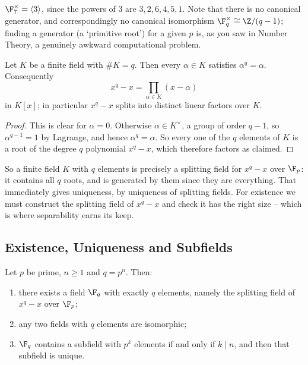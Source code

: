 \begin{example}
	$\F_7^\times = \langle 3 \rangle$, since the powers of $3$ are $3, 2, 6, 4, 5, 1$. Note that there is no canonical generator, and correspondingly no canonical isomorphism $\F_q^\times \cong \Z/(q-1)$; finding a generator (a `primitive root') for a given $p$ is, as you saw in Number Theory, a genuinely awkward computational problem.
\end{example}

\begin{lemma}\label{lem:fermat}
	Let $K$ be a finite field with $\#K = q$. Then every $\alpha \in K$ satisfies $\alpha^q = \alpha$. Consequently
	$$x^q - x = \prod_{\alpha \in K}(x - \alpha)$$
	in $K[x]$; in particular $x^q - x$ splits into distinct linear factors over $K$.
\end{lemma}

\begin{proof}
	This is clear for $\alpha = 0$. Otherwise $\alpha \in K^\times$, a group of order $q-1$, so $\alpha^{q-1} = 1$ by Lagrange, and hence $\alpha^q = \alpha$. So every one of the $q$ elements of $K$ is a root of the degree $q$ polynomial $x^q - x$, which therefore factors as claimed.
\end{proof}

So a finite field $K$ with $q$ elements is precisely a splitting field for $x^q - x$ over $\F_p$: it contains all $q$ roots, and is generated by them since they are everything. That immediately gives uniqueness, by uniqueness of splitting fields. For existence we must construct the splitting field of $x^q-x$ and check it has the right size -- which is where separability earns its keep.

\subsection{Existence, Uniqueness and Subfields}

\begin{theorem}\label{thm:finitefields}
	Let $p$ be prime, $n \geq 1$ and $q = p^n$. Then:
	\begin{enumerate}[label=(\roman*)]
		\item there exists a field $\F_q$ with exactly $q$ elements, namely the splitting field of $x^q-x$ over $\F_p$;
		\item any two fields with $q$ elements are isomorphic;
		\item $\F_q$ contains a subfield with $p^k$ elements if and only if $k \mid n$, and then that subfield is unique.
	\end{enumerate}
\end{theorem}

